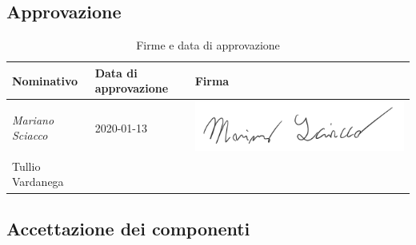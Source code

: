 		\subsection{Approvazione}
			
			\begin{table}[!h]
				\centering
				\begin{tabular}{|l|l|l|}
					\hline
					\textbf{Nominativo} & \textbf{Data di approvazione} & \textbf{Firma} \\ \hline
					\textit{Mariano Sciacco} & 2020-01-13 &  \includegraphics[scale=0.6]{images/firme/mariano}  \\ \hline
					Tullio Vardanega &  & \\ \hline
				\end{tabular}
				\caption{Firme e data di approvazione}
			\end{table}
			
		\subsection{Accettazione dei componenti}
			
